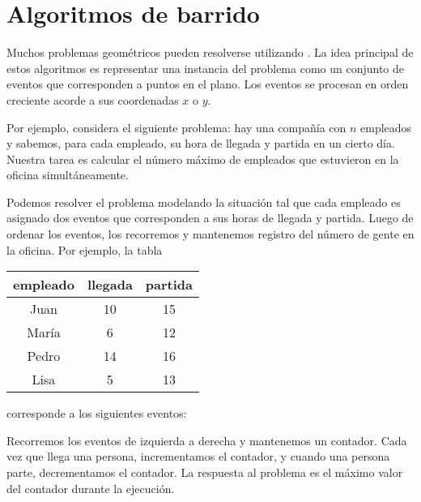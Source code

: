 \chapter{Algoritmos de barrido}


Muchos problemas geométricos pueden resolverse utilizando . La idea principal de estos algoritmos es representar una instancia
del problema como un conjunto de eventos que corresponden a puntos en el
plano. Los eventos se procesan en orden creciente acorde a sus coordenadas
$x$ o $y$.

Por ejemplo, considera el siguiente problema: hay una compañía con $n$
empleados y sabemos, para cada empleado, su hora de llegada y partida en
un cierto día. Nuestra tarea es calcular el número máximo de empleados que
estuvieron en la oficina simultáneamente.

Podemos resolver el problema modelando la situación tal que cada empleado
es asignado dos eventos que corresponden a sus horas de llegada y partida.
Luego de ordenar los eventos, los recorremos y mantenemos registro del
número de gente en la oficina. Por ejemplo, la tabla
\begin{center}
    \begin{tabular}{ccc}
        empleado & llegada & partida \\
        \hline
        Juan     & 10      & 15      \\
        María    & 6       & 12      \\
        Pedro    & 14      & 16      \\
        Lisa     & 5       & 13      \\
    \end{tabular}
\end{center}
corresponde a los siguientes eventos:
\begin{center}
\end{center}
Recorremos los eventos de izquierda a derecha y mantenemos un contador. Cada
vez que llega una persona, incrementamos el contador, y cuando una persona
parte, decrementamos el contador. La respuesta al problema es el máximo
valor del contador durante la ejecución.

